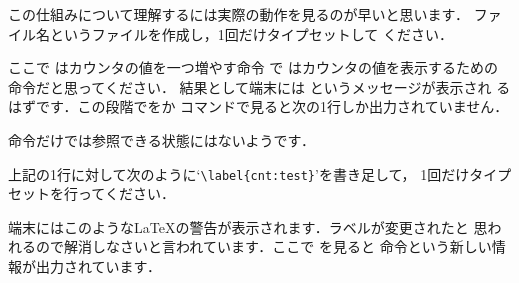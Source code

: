 

この仕組みについて理解するには実際の動作を見るのが早いと思います．
ファイル名というファイルを作成し，1回だけタイプセットして
ください．



ここで はカウンタの値を一つ増やす命令
で はカウンタの値を表示するための
命令だと思ってください．
結果として端末には  というメッセージが表示され
るはずです．この段階でをか
コマンドで見ると次の1行しか出力されていません．

\begin{InTeX}
\relax 
\end{InTeX}

命令だけでは参照できる状態にはないようです．

\begin{InTeX}
 \thetest
\end{InTeX}

上記の1行に対して次のように`\verb|\label{cnt:test}|'を書き足して，
1回だけタイプセットを行ってください．

\begin{InTeX}
 \thetest \label{cnt:test}
\end{InTeX}


\begin{flushleft}
\end{flushleft}
端末にはこのような{\LaTeX}の警告が表示されます．ラベルが変更されたと
思われるので解消しなさいと言われています．ここで
を見ると 命令という新しい情報が出力されています．

